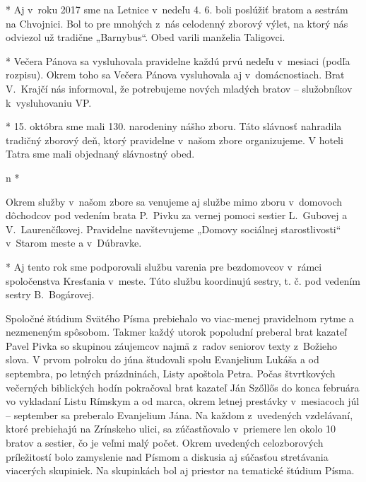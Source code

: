* 
Aj v~roku 2017 sme na Letnice v~nedeľu 4. 6.  boli poslúžiť bratom a sestrám na Chvojnici. Bol to pre mnohých z~nás celodenný zborový výlet, na ktorý nás odviezol už tradične „Barnybus“. Obed varili manželia Taligovci.

* 
Večera Pánova sa vysluhovala pravidelne každú prvú nedeľu v~mesiaci (podľa rozpisu). Okrem toho sa Večera Pánova vysluhovala aj v~domácnostiach. Brat V.~Krajčí nás informoval, že potrebujeme nových mladých bratov -- služobníkov k~vysluhovaniu VP.

* 
15. októbra sme mali 130. narodeniny nášho zboru. Táto slávnosť nahradila tradičný zborový deň, ktorý pravidelne v~našom zbore organizujeme. V hoteli Tatra sme mali objednaný slávnostný obed.
\enditems


\begitems \style n
* 

Okrem služby v~našom zbore sa venujeme aj službe mimo zboru v~domovoch dôchodcov pod vedením brata P.~Pivku za vernej pomoci sestier L.~Gubovej a V.~Laurenčíkovej. Pravidelne navštevujeme „Domovy sociálnej starostlivosti“ v~Starom meste a v~Dúbravke.

* 
Aj tento rok sme podporovali službu varenia pre bezdomovcov v~rámci spoločenstva Kresťania v~meste. Túto službu koordinujú sestry, t. č. pod vedením sestry B.~Bogárovej.
\enditems



Spoločné štúdium Svätého Písma prebiehalo vo viac-menej pravidelnom rytme a nezmeneným spôsobom. Takmer každý utorok popoludní preberal brat kazateľ Pavel Pivka so skupinou záujemcov najmä z~radov seniorov texty z~Božieho slova. V prvom polroku do júna študovali spolu Evanjelium Lukáša a od septembra, po letných prázdninách, Listy apoštola Petra. Počas štvrtkových večerných biblických hodín pokračoval brat kazateľ Ján Szőllős do konca februára vo vykladaní Listu Rímskym a od marca, okrem letnej prestávky v~mesiacoch júl – september sa preberalo Evanjelium Jána. Na každom z~uvedených vzdelávaní, ktoré prebiehajú na Zrínskeho ulici, sa zúčastňovalo v~priemere len okolo 10 bratov a sestier, čo je veľmi malý počet.  Okrem uvedených celozborových príležitostí bolo zamyslenie nad Písmom a diskusia aj súčasťou stretávania viacerých skupiniek. Na skupinkách bol aj priestor na tematické štúdium Písma.

